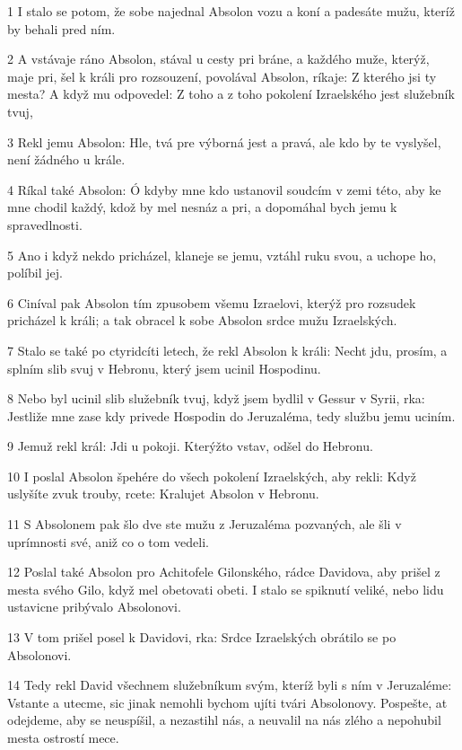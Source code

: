 \par 1 I stalo se potom, že sobe najednal Absolon vozu a koní a padesáte mužu, kteríž by behali pred ním.
\par 2 A vstávaje ráno Absolon, stával u cesty pri bráne, a každého muže, kterýž, maje pri, šel k králi pro rozsouzení, povolával Absolon, ríkaje: Z kterého jsi ty mesta? A když mu odpovedel: Z toho a z toho pokolení Izraelského jest služebník tvuj,
\par 3 Rekl jemu Absolon: Hle, tvá pre výborná jest a pravá, ale kdo by te vyslyšel, není žádného u krále.
\par 4 Ríkal také Absolon: Ó kdyby mne kdo ustanovil soudcím v zemi této, aby ke mne chodil každý, kdož by mel nesnáz a pri, a dopomáhal bych jemu k spravedlnosti.
\par 5 Ano i když nekdo pricházel, klaneje se jemu, vztáhl ruku svou, a uchope ho, políbil jej.
\par 6 Ciníval pak Absolon tím zpusobem všemu Izraelovi, kterýž pro rozsudek pricházel k králi; a tak obracel k sobe Absolon srdce mužu Izraelských.
\par 7 Stalo se také po ctyridcíti letech, že rekl Absolon k králi: Necht jdu, prosím, a splním slib svuj v Hebronu, který jsem ucinil Hospodinu.
\par 8 Nebo byl ucinil slib služebník tvuj, když jsem bydlil v Gessur v Syrii, rka: Jestliže mne zase kdy privede Hospodin do Jeruzaléma, tedy službu jemu uciním.
\par 9 Jemuž rekl král: Jdi u pokoji. Kterýžto vstav, odšel do Hebronu.
\par 10 I poslal Absolon špehére do všech pokolení Izraelských, aby rekli: Když uslyšíte zvuk trouby, rcete: Kralujet Absolon v Hebronu.
\par 11 S Absolonem pak šlo dve ste mužu z Jeruzaléma pozvaných, ale šli v uprímnosti své, aniž co o tom vedeli.
\par 12 Poslal také Absolon pro Achitofele Gilonského, rádce Davidova, aby prišel z mesta svého Gilo, když mel obetovati obeti. I stalo se spiknutí veliké, nebo lidu ustavicne pribývalo Absolonovi.
\par 13 V tom prišel posel k Davidovi, rka: Srdce Izraelských obrátilo se po Absolonovi.
\par 14 Tedy rekl David všechnem služebníkum svým, kteríž byli s ním v Jeruzaléme: Vstante a utecme, sic jinak nemohli bychom ujíti tvári Absolonovy. Pospešte, at odejdeme, aby se neuspíšil, a nezastihl nás, a neuvalil na nás zlého a nepohubil mesta ostrostí mece.
